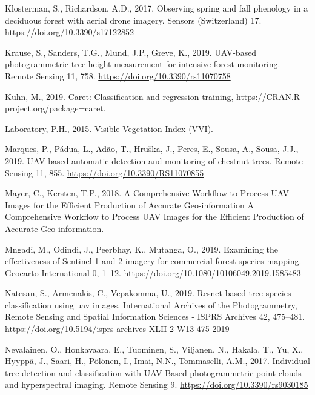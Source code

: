\documentclass[]{article}
\begin{document}
\leavevmode\hypertarget{ref-Klosterman2017}{}%
Klosterman, S., Richardson, A.D., 2017. Observing spring and fall
phenology in a deciduous forest with aerial drone imagery. Sensors
(Switzerland) 17. \url{https://doi.org/10.3390/s17122852}

\leavevmode\hypertarget{ref-Krause2019a}{}%
Krause, S., Sanders, T.G., Mund, J.P., Greve, K., 2019. UAV-based
photogrammetric tree height measurement for intensive forest monitoring.
Remote Sensing 11, 758. \url{https://doi.org/10.3390/rs11070758}

\leavevmode\hypertarget{ref-R-caret}{}%
Kuhn, M., 2019. Caret: Classification and regression training,
https://CRAN.R-project.org/package=caret.

\leavevmode\hypertarget{ref-Laboratory2015}{}%
Laboratory, P.H., 2015. Visible Vegetation Index (VVI).

\leavevmode\hypertarget{ref-Marques2019a}{}%
Marques, P., Pádua, L., Adão, T., Hruška, J., Peres, E., Sousa, A.,
Sousa, J.J., 2019. UAV-based automatic detection and monitoring of
chestnut trees. Remote Sensing 11, 855.
\url{https://doi.org/10.3390/RS11070855}

\leavevmode\hypertarget{ref-Mayer2018}{}%
Mayer, C., Kersten, T.P., 2018. A Comprehensive Workflow to Process UAV
Images for the Efficient Production of Accurate Geo-information A
Comprehensive Workflow to Process UAV Images for the Efficient
Production of Accurate Geo-information.

\leavevmode\hypertarget{ref-Mngadi2019}{}%
Mngadi, M., Odindi, J., Peerbhay, K., Mutanga, O., 2019. Examining the
effectiveness of Sentinel-1 and 2 imagery for commercial forest species
mapping. Geocarto International 0, 1--12.
\url{https://doi.org/10.1080/10106049.2019.1585483}

\leavevmode\hypertarget{ref-Natesan2019}{}%
Natesan, S., Armenakis, C., Vepakomma, U., 2019. Resnet-based tree
species classification using uav images. International Archives of the
Photogrammetry, Remote Sensing and Spatial Information Sciences - ISPRS
Archives 42, 475--481.
\url{https://doi.org/10.5194/isprs-archives-XLII-2-W13-475-2019}

\leavevmode\hypertarget{ref-Nevalainen2017}{}%
Nevalainen, O., Honkavaara, E., Tuominen, S., Viljanen, N., Hakala, T.,
Yu, X., Hyyppä, J., Saari, H., Pölönen, I., Imai, N.N., Tommaselli,
A.M., 2017. Individual tree detection and classification with UAV-Based
photogrammetric point clouds and hyperspectral imaging. Remote Sensing
9. \url{https://doi.org/10.3390/rs9030185}
\end{document}
